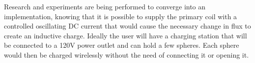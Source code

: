 Research and experiments are being performed to converge into an implementation, knowing that it is possible to supply the primary coil with a controlled oscillating DC current that would cause the necessary change in flux to create an inductive charge. Ideally the user will have a charging station that will be connected to a 120V power outlet and can hold a few spheres. Each sphere would then be charged wirelessly without the need of connecting it or opening it.
